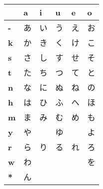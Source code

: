 


\bigskip
\begin{center}
\Huge

\begin{tabular}{m{1.0cm}||m{1.0cm}|m{1.0cm}|m{1.0cm}|m{1.0cm}|m{1.0cm}|}
& \textbf{a}& \textbf{i}& \textbf{u}& \textbf{e}& \textbf{o}\\ \hline \hline
\textbf{-}&\smallskip あ&\smallskip い&\smallskip う&\smallskip え&\smallskip お\\ \hline
\textbf{k}&\smallskip か&\smallskip き&\smallskip く&\smallskip け&\smallskip こ\\ \hline
\textbf{s}&\smallskip さ&\smallskip し&\smallskip す&\smallskip せ&\smallskip そ\\ \hline
\textbf{t}&\smallskip た&\smallskip ち&\smallskip つ&\smallskip て&\smallskip と\\ \hline
\textbf{n}&\smallskip な&\smallskip に&\smallskip ぬ&\smallskip ね&\smallskip の\\ \hline
\textbf{h}&\smallskip は&\smallskip ひ&\smallskip ふ&\smallskip へ&\smallskip ほ\\ \hline
\textbf{m}&\smallskip ま&\smallskip み&\smallskip む&\smallskip め&\smallskip も\\ \hline
\textbf{y}&\smallskip や&\smallskip   &\smallskip ゆ&\smallskip   &\smallskip よ\\ \hline
\textbf{r}&\smallskip ら&\smallskip り&\smallskip る&\smallskip れ&\smallskip ろ\\ \hline
\textbf{w}&\smallskip わ&\smallskip   &\smallskip   &\smallskip   &\smallskip を\\ \hline
\textbf{*}&\smallskip ん&\smallskip   &\smallskip   &\smallskip   &\smallskip   \\ \hline
\end{tabular}
\end{center}
